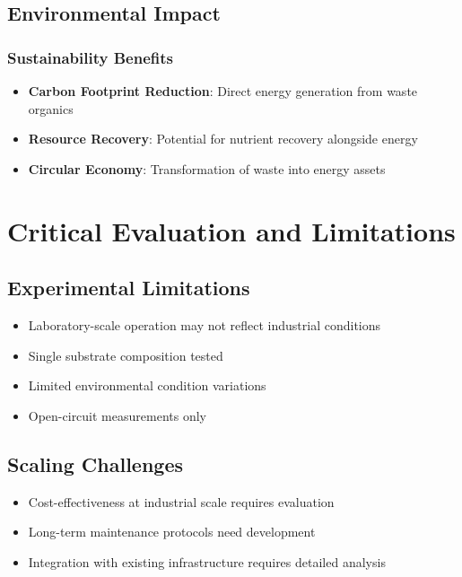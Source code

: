 \documentclass[12pt,a4paper]{article}
\begin{document}
\subsection{Environmental Impact}

\subsubsection{Sustainability Benefits}

\begin{itemize}
    \item \textbf{Carbon Footprint Reduction}: Direct energy generation from waste organics
    \item \textbf{Resource Recovery}: Potential for nutrient recovery alongside energy
    \item \textbf{Circular Economy}: Transformation of waste into energy assets
\end{itemize}

\section{Critical Evaluation and Limitations}

\subsection{Experimental Limitations}

\begin{itemize}
    \item Laboratory-scale operation may not reflect industrial conditions
    \item Single substrate composition tested
    \item Limited environmental condition variations
    \item Open-circuit measurements only
\end{itemize}

\subsection{Scaling Challenges}

\begin{itemize}
    \item Cost-effectiveness at industrial scale requires evaluation
    \item Long-term maintenance protocols need development
    \item Integration with existing infrastructure requires detailed analysis
\end{itemize}
\end{document}
